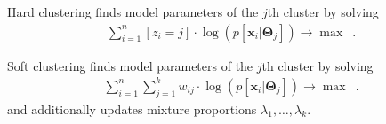 \documentclass[landscape,footrule]{foils}
\begin{document}

Hard clustering finds model parameters of the $j$th cluster by solving 
\begin{align*}
\sum_{i=1}^n [z_i=j]\cdot\log\left(p[\boldsymbol{x}_i|\boldsymbol{\Theta}_j]\right)\to\max\enspace.
\end{align*}

Soft clustering finds model parameters of the $j$th cluster by solving 
\begin{align*}
\sum_{i=1}^n 
\sum_{j=1}^k w_{ij}\cdot \log\left(p[\boldsymbol{x}_i|\boldsymbol{\Theta}_j]\right)\to\max\enspace.
\end{align*}
and additionally updates mixture proportions $\lambda_1,\ldots,\lambda_k$.
\end{document}
